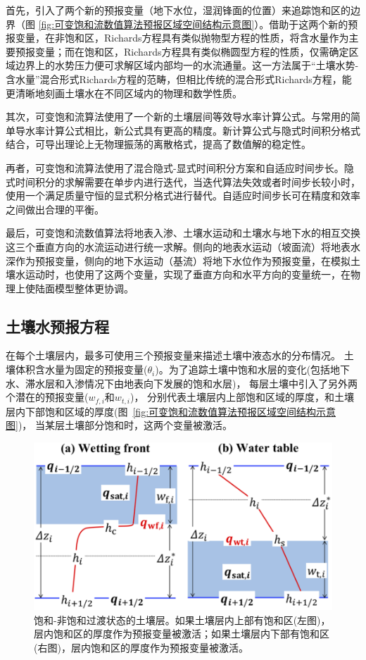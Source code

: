 首先，引入了两个新的预报变量（地下水位，湿润锋面的位置）来追踪饱和区的边界（图 \ref{fig:可变饱和流数值算法预报区域空间结构示意图}）。借助于这两个新的预报变量，在非饱和区，Richards方程具有类似抛物型方程的性质，将含水量作为主要预报变量；而在饱和区，Richards方程具有类似椭圆型方程的性质，仅需确定区域边界上的水势压力便可求解区域内部均一的水流通量。这一方法属于“土壤水势-含水量”混合形式Richards方程的范畴，但相比传统的混合形式Richards方程，能更清晰地刻画土壤水在不同区域内的物理和数学性质。

其次，可变饱和流算法使用了一个新的土壤层间等效导水率计算公式。与常用的简单导水率计算公式相比，新公式具有更高的精度。新计算公式与隐式时间积分格式结合，可导出理论上无物理振荡的离散格式，提高了数值解的稳定性。

再者，可变饱和流算法使用了混合隐式-显式时间积分方案和自适应时间步长。隐式时间积分的求解需要在单步内进行迭代，当迭代算法失效或者时间步长较小时，使用一个满足质量守恒的显式积分格式进行替代。自适应时间步长可在精度和效率之间做出合理的平衡。

最后，可变饱和流数值算法将地表入渗、土壤水运动和土壤水与地下水的相互交换这三个垂直方向的水流运动进行统一求解。侧向的地表水运动（坡面流）将地表水深作为预报变量，侧向的地下水运动（基流）将地下水位作为预报变量，在模拟土壤水运动时，也使用了这两个变量，实现了垂直方向和水平方向的变量统一，在物理上使陆面模型整体更协调。


\subsection{土壤水预报方程}
在每个土壤层内，最多可使用三个预报变量来描述土壤中液态水的分布情况。
土壤体积含水量为固定的预报变量($\theta_i$)。为了追踪土壤中饱和水层的变化(包括地下水、滞水层和入渗情况下由地表向下发展的饱和水层)，
每层土壤中引入了另外两个潜在的预报变量($w_{f,i}$和$w_{t,i}$)，
分别代表土壤层内上部饱和区域的厚度，和土壤层内下部饱和区域的厚度(图~\ref{fig:可变饱和流数值算法预报区域空间结构示意图})，
当某层土壤部分饱和时，这两个变量被激活。
{
\begin{figure}[htbp]
\centering
\includegraphics{Figures/陆地表面的水分循环/饱和-非饱和过渡状态的土壤层.png}
\caption{饱和-非饱和过渡状态的土壤层。如果土壤层内上部有饱和区(左图)，
层内饱和区的厚度作为预报变量被激活；如果土壤层内下部有饱和区(右图)，层内饱和区的厚度作为预报变量被激活。}
\label{fig:饱和-非饱和过渡状态的土壤层}
\end{figure}
}

